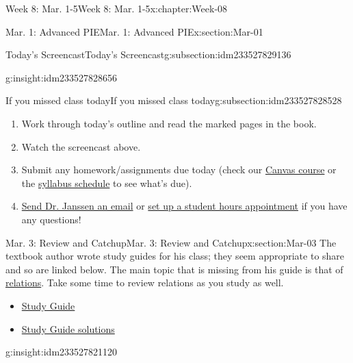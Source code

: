 \documentclass[oneside,10pt,]{book}
\numberwithin{equation}{section}
\newlength{\qrsize}
\newlength{\previewwidth}
\begin{document}
\begin{chapterptx}{Week 8: Mar. 1-5}{}{Week 8: Mar. 1-5}{}{}{x:chapter:Week-08}
\begin{sectionptx}{Mar. 1: Advanced PIE}{}{Mar. 1: Advanced PIE}{}{}{x:section:Mar-01}
\begin{subsectionptx}{Today's Screencast}{}{Today's Screencast}{}{}{g:subsection:idm233527829136}
\begin{insight}{}{g:insight:idm233527828656}%
\end{insight}
\end{subsectionptx}
%
%
\typeout{************************************************}
\typeout{************************************************}
%
\begin{subsectionptx}{If you missed class today}{}{If you missed class today}{}{}{g:subsection:idm233527828528}
%
\begin{enumerate}
\item{}Work through today's outline and read the marked pages in the book.%
\item{}Watch the screencast above.%
\item{}Submit any homework\slash{}assignments due today (check our \href{https://dordt.instructure.com/courses/3110050}{Canvas course} or the \href{https://prof.mkjanssen.org/ds/index.html\#schedule}{syllabus schedule} to see what's due).%
\item{}\href{mailto:mike.janssen@dordt.edu}{Send Dr. Janssen an email} or \href{https://calendly.com/mkjanssen/student-hours}{set up a student hours appointment} if you have any questions!%
\end{enumerate}
\end{subsectionptx}
\end{sectionptx}
%
%
\typeout{************************************************}
\typeout{************************************************}
%
\begin{sectionptx}{Mar. 3: Review and Catchup}{}{Mar. 3: Review and Catchup}{}{}{x:section:Mar-03}
The textbook author wrote study guides for his class; they seem appropriate to share and so are linked below. The main topic that is missing from his guide is that of \href{https://prof.mkjanssen.org/ds/notes/Jan-29.html}{relations}. Take some time to review relations as you study as well.%
%
\begin{itemize}[label=\textbullet]
\item{}\href{./Exam1Guide.pdf}{Study Guide}%
\item{}\href{./Exam1Guide-solutions.pdf}{Study Guide solutions}%
\end{itemize}
\begin{insight}{}{g:insight:idm233527821120}%
\setlength{\qrsize}{9em}
\setlength{\previewwidth}{\linewidth}
\addtolength{\previewwidth}{-\qrsize}
\begin{tcbraster}[raster columns=2, raster column skip=1pt, raster halign=center, raster force size=false, raster left skip=0pt, raster right skip=0pt]%

\end{tcbraster}
\end{insight}
\end{sectionptx}
\end{chapterptx}
\end{document}
